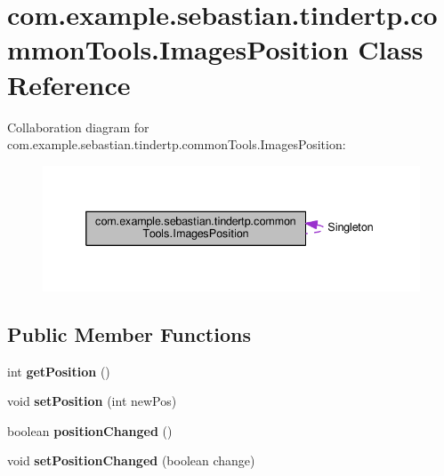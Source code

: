 \hypertarget{classcom_1_1example_1_1sebastian_1_1tindertp_1_1commonTools_1_1ImagesPosition}{}\section{com.\+example.\+sebastian.\+tindertp.\+common\+Tools.\+Images\+Position Class Reference}
\label{classcom_1_1example_1_1sebastian_1_1tindertp_1_1commonTools_1_1ImagesPosition}


Collaboration diagram for com.\+example.\+sebastian.\+tindertp.\+common\+Tools.\+Images\+Position\+:\nopagebreak
\begin{figure}[H]
\begin{center}
\leavevmode
\includegraphics[width=337pt]{classcom_1_1example_1_1sebastian_1_1tindertp_1_1commonTools_1_1ImagesPosition__coll__graph}
\end{center}
\end{figure}
\subsection*{Public Member Functions}
\begin{DoxyCompactItemize}
\item 
int {\bfseries get\+Position} ()\hypertarget{classcom_1_1example_1_1sebastian_1_1tindertp_1_1commonTools_1_1ImagesPosition_a7a5927570ad14dc431dc0c40e28a2af6}{}\label{classcom_1_1example_1_1sebastian_1_1tindertp_1_1commonTools_1_1ImagesPosition_a7a5927570ad14dc431dc0c40e28a2af6}

\item 
void {\bfseries set\+Position} (int new\+Pos)\hypertarget{classcom_1_1example_1_1sebastian_1_1tindertp_1_1commonTools_1_1ImagesPosition_a40d84bc1b8392413ea024a205cf62913}{}\label{classcom_1_1example_1_1sebastian_1_1tindertp_1_1commonTools_1_1ImagesPosition_a40d84bc1b8392413ea024a205cf62913}

\item 
boolean {\bfseries position\+Changed} ()\hypertarget{classcom_1_1example_1_1sebastian_1_1tindertp_1_1commonTools_1_1ImagesPosition_a80fd13ee437c4c527b734267c7fb80ce}{}\label{classcom_1_1example_1_1sebastian_1_1tindertp_1_1commonTools_1_1ImagesPosition_a80fd13ee437c4c527b734267c7fb80ce}

\item 
void {\bfseries set\+Position\+Changed} (boolean change)\hypertarget{classcom_1_1example_1_1sebastian_1_1tindertp_1_1commonTools_1_1ImagesPosition_a305b1727080316b7c045c1f2925597a1}{}\label{classcom_1_1example_1_1sebastian_1_1tindertp_1_1commonTools_1_1ImagesPosition_a305b1727080316b7c045c1f2925597a1}

\end{DoxyCompactItemize}
